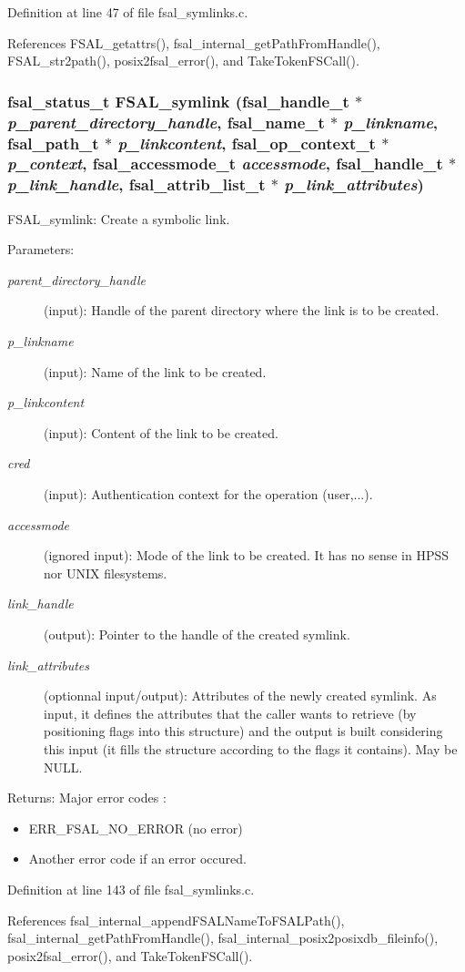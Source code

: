 Definition at line 47 of file fsal\_\-symlinks.c.

References FSAL\_\-getattrs(), fsal\_\-internal\_\-get\-Path\-From\-Handle(), FSAL\_\-str2path(), posix2fsal\_\-error(), and Take\-Token\-FSCall().
\subsubsection{\setlength{\rightskip}{0pt plus 5cm}fsal\_\-status\_\-t FSAL\_\-symlink (fsal\_\-handle\_\-t $\ast$ {\em p\_\-parent\_\-directory\_\-handle}, fsal\_\-name\_\-t $\ast$ {\em p\_\-linkname}, fsal\_\-path\_\-t $\ast$ {\em p\_\-linkcontent}, fsal\_\-op\_\-context\_\-t $\ast$ {\em p\_\-context}, fsal\_\-accessmode\_\-t {\em accessmode}, fsal\_\-handle\_\-t $\ast$ {\em p\_\-link\_\-handle}, fsal\_\-attrib\_\-list\_\-t $\ast$ {\em p\_\-link\_\-attributes})}\label{fsal__symlinks_8c_a1}


FSAL\_\-symlink: Create a symbolic link.

\begin{Desc}
\item[Parameters:]
\begin{description}
\item[{\em parent\_\-directory\_\-handle}](input): Handle of the parent directory where the link is to be created. \item[{\em p\_\-linkname}](input): Name of the link to be created. \item[{\em p\_\-linkcontent}](input): Content of the link to be created. \item[{\em cred}](input): Authentication context for the operation (user,...). \item[{\em accessmode}](ignored input): Mode of the link to be created. It has no sense in HPSS nor UNIX filesystems. \item[{\em link\_\-handle}](output): Pointer to the handle of the created symlink. \item[{\em link\_\-attributes}](optionnal input/output): Attributes of the newly created symlink. As input, it defines the attributes that the caller wants to retrieve (by positioning flags into this structure) and the output is built considering this input (it fills the structure according to the flags it contains). May be NULL.\end{description}
\end{Desc}
\begin{Desc}
\item[Returns:]Major error codes :\begin{itemize}
\item ERR\_\-FSAL\_\-NO\_\-ERROR (no error)\item Another error code if an error occured. \end{itemize}
\end{Desc}


Definition at line 143 of file fsal\_\-symlinks.c.

References fsal\_\-internal\_\-append\-FSALName\-To\-FSALPath(), fsal\_\-internal\_\-get\-Path\-From\-Handle(), fsal\_\-internal\_\-posix2posixdb\_\-fileinfo(), posix2fsal\_\-error(), and Take\-Token\-FSCall().